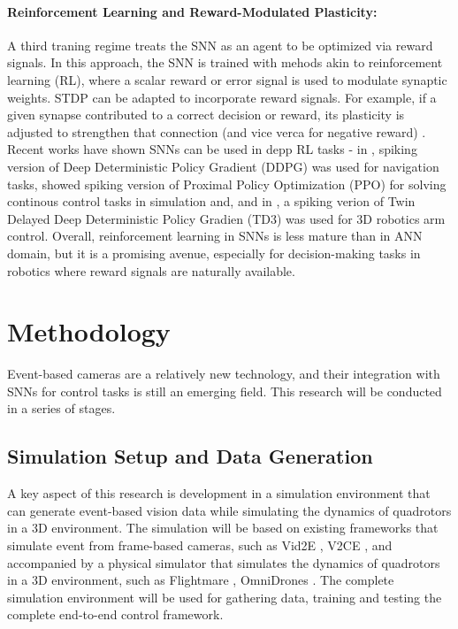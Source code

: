 \documentclass{article}
\begin{document}
\paragraph{Reinforcement Learning and Reward-Modulated Plasticity:} A third traning regime treats the SNN as an agent to be optimized via reward signals. In this approach, the SNN is trained with mehods akin to reinforcement learning (RL), where a scalar reward or error signal is used to modulate synaptic weights. STDP can be adapted to incorporate reward signals. For example, if a given synapse contributed to a correct decision or reward, its plasticity is adjusted to strengthen that connection (and vice verca for negative reward) \cite{yamazakiSpikingNeuralNetworks2022}. Recent works have shown SNNs can be used in depp RL tasks - in \cite{tangReinforcementCoLearningDeep2020}, spiking version of Deep Deterministic Policy Gradient (DDPG) was used for navigation tasks, \cite{zanattaExploringSpikingNeural2024a} showed spiking version of Proximal Policy Optimization (PPO) for solving continous control tasks in simulation
and, and in \cite{parkDesigningSpikingNeural2025}, a spiking verion of Twin Delayed Deep Deterministic Policy Gradien (TD3) was used for 3D robotics arm control. Overall, reinforcement learning in SNNs is less mature than in ANN domain, but it is a promising avenue, especially for decision-making tasks in robotics where reward signals are naturally available.

\section{Methodology}
Event-based cameras are a relatively new technology, and their integration with SNNs for control tasks is still an emerging field. This research will be conducted in a series of stages.

\subsection{Simulation Setup and Data Generation}
A key aspect of this research is development in a simulation environment that can generate event-based vision data while simulating the dynamics of quadrotors in a 3D environment. The simulation will be based on existing frameworks that simulate event from frame-based cameras, such as Vid2E \cite{gehrigVideoEventsRecycling2019}, V2CE \cite{ zhangV2CEVideoContinuous2023}, and accompanied by a physical simulator that simulates the dynamics of quadrotors in a 3D environment, such as Flightmare \cite{songFlightmareFlexibleQuadrotor2020}, OmniDrones \cite{xuOmniDronesEfficientFlexible2023}. The complete simulation environment will be used for gathering data, training and testing the complete end-to-end control framework. 
\end{document}
